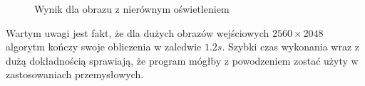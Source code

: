 \documentclass[12pt]{article}
\begin{document}
\begin{figure}[H]%
\centering
{}%
\qquad
{}%
\caption{Wynik dla obrazu z nierównym oświetleniem}
\label{light}
\end{figure}

Wartym uwagi jest fakt, że dla dużych obrazów wejściowych $2560\times2048$ algorytm kończy swoje obliczenia w zaledwie $1.2s$. Szybki czas wykonania wraz z dużą dokładnością sprawiają, że program mógłby z powodzeniem zostać użyty w zastosowaniach przemysłowych.
\end{document}
